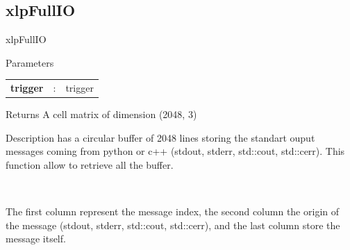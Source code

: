 \subsection{xlpFullIO}

\begin{xlpfunctitle}{xlpFullIO}

\begin{xlpfunc}{Parameters}
\begin{tabular}{p{3.5cm}cl}
\textbf{trigger}& : & trigger 
\end{tabular}
\end{xlpfunc}


\begin{xlpfunc}{Returns}
A cell matrix of dimension (2048, 3)
\end{xlpfunc}

\begin{xlpfunc}{Description}
\xlp has a circular buffer of 2048 lines storing the standart ouput messages coming from python or c++ (stdout, stderr, std::cout, std::cerr). This function allow to retrieve all the buffer. 

\

The first column represent the message index, the second column the origin of the message (stdout, stderr, std::cout, std::cerr), and the last column store the message itself. 
\end{xlpfunc}
\end{xlpfunctitle}

